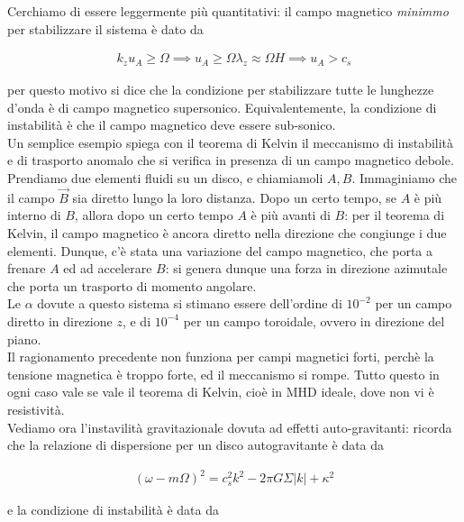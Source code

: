 \documentclass{report}
\begin{document}
Cerchiamo di essere leggermente più quantitativi: il campo magnetico \emph{minimmo} per stabilizzare il sistema è dato da 

\begin{align}
    k_z u_A \geq \Omega \implies u_A \geq \Omega \lambda_z \approx \Omega H \implies u_A > c_s
\end{align}

per questo motivo si dice che la condizione per stabilizzare tutte le lunghezze d'onda è di campo magnetico supersonico. Equivalentemente, la condizione di instabilità è che il campo magnetico deve essere sub-sonico. \\

Un semplice esempio spiega con il teorema di Kelvin il meccanismo di instabilità e di trasporto anomalo che si verifica in presenza di un campo magnetico debole. Prendiamo due elementi fluidi su un disco, e chiamiamoli \(A, B\). Immaginiamo che il campo \(\vec{B}\) sia diretto lungo la loro distanza. Dopo un certo tempo, se \(A\) è più interno di \(B\), allora dopo un certo tempo \(A\) è più avanti di \(B\): per il teorema di Kelvin, il campo magnetico è ancora diretto nella direzione che congiunge i due elementi. Dunque, c'è stata una variazione del campo magnetico, che porta a frenare \(A\) ed ad accelerare \(B\): si genera dunque una forza in direzione azimutale che porta un trasporto di momento angolare. \\

Le \(\alpha\) dovute a questo sistema si stimano essere dell'ordine di \(10^{-2}\) per un campo diretto in direzione \(z\), e di \(10^{-4}\) per un campo toroidale, ovvero in direzione del piano. \\

Il ragionamento precedente non funziona per campi magnetici forti, perchè la tensione magnetica è troppo forte, ed il meccanismo si rompe. Tutto questo in ogni caso vale se vale il teorema di Kelvin, cioè in MHD ideale, dove non vi è resistività. \\

Vediamo ora l'instavilità gravitazionale dovuta ad effetti auto-gravitanti: ricorda che la relazione di dispersione per un disco autogravitante è data da 

\begin{align}
    (\omega -m\Omega)^2 = c_s^2 k^2 - 2\pi G \Sigma |k| + \kappa^2
\end{align}

e la condizione di instabilità è data da 
\end{document}

